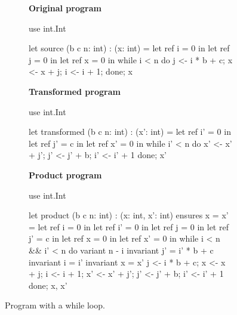 \begin{figure}
  \centering
  \begin{subfigure}[b]{0.45\textwidth}
    \begin{minipage}[t]{\linewidth}
      \textbf{Original program}
      \begin{whylang}
        use int.Int

        let source (b c n: int) : (x: int)
        = let ref i = 0 in
          let ref j = 0 in
          let ref x = 0 in
          while i < n do
            j <- i * b + c;
            x <- x + j;
            i <- i + 1;
          done;
          x
      \end{whylang}
    \end{minipage}
  \end{subfigure}
  \hfill
  \begin{subfigure}[b]{0.45\textwidth}
    \begin{minipage}[t]{\linewidth}
      \textbf{Transformed program}
      \begin{whylang}
        use int.Int

        let transformed (b c n: int) : (x': int)
        = let ref i' = 0 in
          let ref j' = c in
          let ref x' = 0 in
          while i' < n do
            x' <- x' + j';
            j' <- j' + b;
            i' <- i' + 1
          done;
          x'
      \end{whylang}
    \end{minipage}
  \end{subfigure}
  \hfill
  \begin{subfigure}[b]{0.9\textwidth}
    \begin{minipage}[t]{\linewidth}
      \textbf{Product program}
      \begin{whylang}
        use int.Int

        let product (b c n: int) : (x: int, x': int)
          ensures { x = x' }
        = let ref i = 0 in
          let ref i' = 0 in
          let ref j = 0 in
          let ref j' = c in
          let ref x = 0 in
          let ref x' = 0 in
          while i < n && i' < n do
            variant   { n - i }
            invariant { j' = i' * b + c }
            invariant { i = i' }
            invariant { x = x' }
            j <- i * b + c;
            x <- x + j;
            i <- i + 1;
            x' <- x' + j';
            j' <- j' + b;
            i' <- i' + 1
          done;
          x, x'
      \end{whylang}
    \end{minipage}
  \end{subfigure}
  \caption{Program with a while loop.}
  \label{fig:pp_ex_while}
\end{figure}

